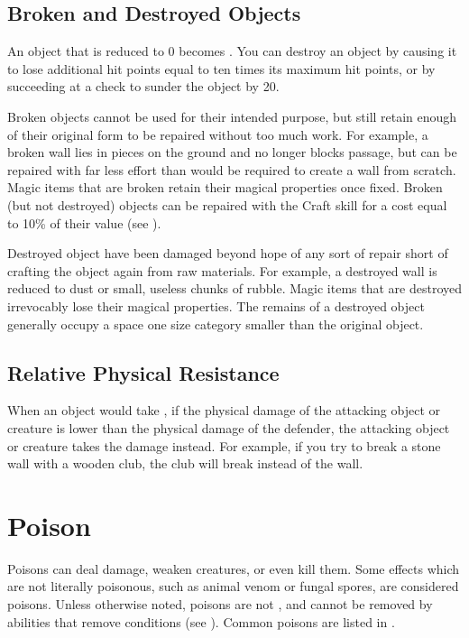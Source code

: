     \subsection{Broken and Destroyed Objects}\label{Broken and Destroyed Objects}
        An object that is reduced to 0  becomes .
        You can destroy an object by causing it to lose additional hit points equal to ten times its maximum hit points, or by succeeding at a check to sunder the object by 20.

        \label{Broken Objects}
        Broken objects cannot be used for their intended purpose, but still retain enough of their original form to be repaired without too much work.
        For example, a broken wall lies in pieces on the ground and no longer blocks passage, but can be repaired with far less effort than would be required to create a wall from scratch.
        Magic items that are broken retain their magical properties once fixed.
        Broken (but not destroyed) objects can be repaired with the Craft skill for a cost equal to 10\% of their value (see ).

        \label{Destroyed Objects}
        Destroyed object have been damaged beyond hope of any sort of repair short of crafting the object again from raw materials.
        For example, a destroyed wall is reduced to dust or small, useless chunks of rubble.
        Magic items that are destroyed irrevocably lose their magical properties.
        The remains of a destroyed object generally occupy a space one size category smaller than the original object.

    \subsection{Relative Physical Resistance}\label{Relative Physical Resistance}
        When an object would take , if the physical damage  of the attacking object or creature is lower than the physical damage  of the defender, the attacking object or creature takes the damage instead.
        For example, if you try to break a stone wall with a wooden club, the club will break instead of the wall.

\section{Poison}\label{Poison}
    Poisons can deal damage, weaken creatures, or even kill them.
    Some effects which are not literally poisonous, such as animal venom or fungal spores, are considered poisons.
    Unless otherwise noted, poisons are not , and cannot be removed by abilities that remove conditions (see ).
    Common poisons are listed in .

